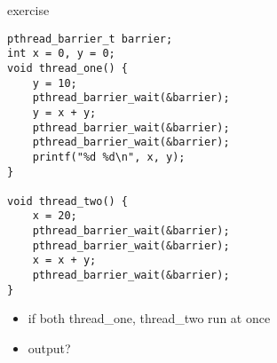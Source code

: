 \begin{frame}[fragile]{exercise}
\lstset{language=C,style=smaller}
\begin{lstlisting}
pthread_barrier_t barrier;
int x = 0, y = 0;
void thread_one() {
    y = 10;
    pthread_barrier_wait(&barrier);
    y = x + y;
    pthread_barrier_wait(&barrier);
    pthread_barrier_wait(&barrier);
    printf("%d %d\n", x, y);
}

void thread_two() {
    x = 20;
    pthread_barrier_wait(&barrier);
    pthread_barrier_wait(&barrier);
    x = x + y;
    pthread_barrier_wait(&barrier);
}
\end{lstlisting}
\begin{itemize}
\item if both thread\_one, thread\_two run at once
\item output? 
\end{itemize}
\end{frame}
